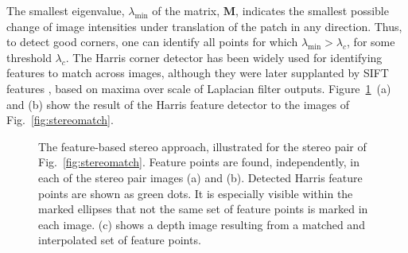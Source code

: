 The smallest eigenvalue, $\lambda_{\mbox{min}}$ of the matrix, $\mathbf{M}$, indicates the smallest possible change of image intensities under translation of the patch in any direction.  Thus, to detect good corners, one can identify all points for which $\lambda_{\mbox{min}} > \lambda_c$, for some threshold $\lambda_c$.
The Harris corner detector has been widely used for identifying features to match across images, although they were later supplanted by SIFT features \cite{Lowe04}, based on maxima over scale of Laplacian filter outputs.  Figure~\ref{fig:stereopoints}~(a) and (b) show the result of the Harris feature detector to the images of Fig.~\ref{fig:stereomatch}.


\begin{figure}
\centerline{
}
\caption{The feature-based stereo approach, illustrated for the stereo pair of Fig.~\ref{fig:stereomatch}.  Feature points are found, independently, in each of the stereo pair images (a) and (b).  Detected Harris feature points \cite{Harris1988} are shown as green dots. It is especially visible within the marked ellipses that not the same set of feature points is marked in each image.  (c) shows a depth image resulting from a matched and interpolated set of feature points.}
\label{fig:stereopoints}
\end{figure}

